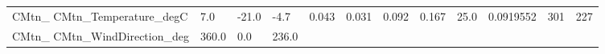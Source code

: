 \documentclass[11pt]{article}
\begin{document}
\begin{longtable}[]{@{}llllllllllll@{}}
\begin{minipage}[t]{0.18\columnwidth}
CMtn\_ CMtn\_Temperature\_degC\strut
\end{minipage} & \begin{minipage}[t]{0.04\columnwidth}\raggedright\strut
7.0\strut
\end{minipage} & \begin{minipage}[t]{0.04\columnwidth}\raggedright\strut
-21.0\strut
\end{minipage} & \begin{minipage}[t]{0.04\columnwidth}\raggedright\strut
-4.7\strut
\end{minipage} & \begin{minipage}[t]{0.04\columnwidth}\raggedright\strut
0.043\strut
\end{minipage} & \begin{minipage}[t]{0.05\columnwidth}\raggedright\strut
0.031\strut
\end{minipage} & \begin{minipage}[t]{0.04\columnwidth}\raggedright\strut
0.092\strut
\end{minipage} & \begin{minipage}[t]{0.04\columnwidth}\raggedright\strut
0.167\strut
\end{minipage} & \begin{minipage}[t]{0.05\columnwidth}\raggedright\strut
25.0\strut
\end{minipage} & \begin{minipage}[t]{0.05\columnwidth}\raggedright\strut
0.0919552\strut
\end{minipage} & \begin{minipage}[t]{0.05\columnwidth}\raggedright\strut
301\strut
\end{minipage} & \begin{minipage}[t]{0.07\columnwidth}\raggedright\strut
227\strut
\end{minipage}\tabularnewline
\begin{minipage}[t]{0.18\columnwidth}\raggedright\strut
CMtn\_ CMtn\_WindDirection\_deg\strut
\end{minipage} & \begin{minipage}[t]{0.04\columnwidth}\raggedright\strut
360.0\strut
\end{minipage} & \begin{minipage}[t]{0.04\columnwidth}\raggedright\strut
0.0\strut
\end{minipage} & \begin{minipage}[t]{0.04\columnwidth}\raggedright\strut
236.0\strut
\end{minipage} & \begin{minipage}[t]{0.04\columnwidth}\raggedright\strut

\end{minipage}
\end{longtable}
\end{document}
